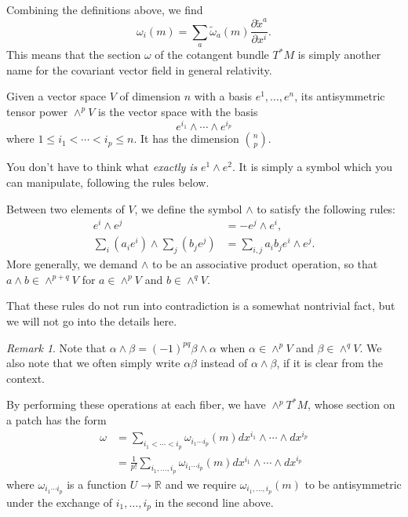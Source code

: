 \documentclass[12pt]{article}
\numberwithin{equation}{section}
\theoremstyle{remark}
\newtheorem{remark}[definition]{Remark}
\def\bR{\mathbb{R}}
\begin{document}
Combining the definitions above, we find \begin{equation}
\omega_i(m)=\sum_a \tilde\omega_a(m) \frac{\partial \tilde x^a}{\partial x^i}.
\end{equation}
This means that the section $\omega$ of the cotangent bundle $T^*M$ is simply another name for the covariant vector field in general relativity.

\begin{definition}
  Given a vector space $V$ of dimension $n$ with a basis $e^1,\ldots,e^n$, 
  its antisymmetric tensor power $\wedge^p V$ is the vector space with the basis \begin{equation}
    e^{i_1}\wedge \cdots \wedge e^{i_p}
  \end{equation} where $1\le i_1<\cdots<i_p\le n$.
  It has the dimension $\binom{n}{p}$.
\end{definition}

You don't have to think what \emph{exactly is} $e^1\wedge e^2$.
It is simply a symbol which you can manipulate, following the rules below.
\begin{definition}
Between two elements of $V$,
we define the symbol $\wedge$ to satisfy the following rules:
\begin{align}
  e^i\wedge e^j &= - e^j\wedge e^i,\\
  \sum_i (a_i e^i) \wedge \sum_j (b_j e^j) &= \sum_{i,j} a_i b_j e^i\wedge e^j.
\end{align}
More generally, we demand $\wedge$ to be an associative product operation,
so that $a\wedge b\in \wedge^{p+q} V$ for $a\in \wedge^p V$ and $b\in \wedge^q V$.
\end{definition}
That these rules do not run into contradiction is a somewhat nontrivial fact,
but we will not go into the details here.
\begin{remark}
  Note that $\alpha\wedge \beta=(-1)^{pq}\beta\wedge \alpha$ when  $\alpha\in \wedge^p V$ and $\beta\in \wedge^q V$.
We also note that we often simply write $\alpha\beta$ instead of $\alpha\wedge \beta$, if it is clear from the context.  
\end{remark}


By performing these operations at each fiber, we have $\wedge^p T^*M$,
whose section on a patch has the form \begin{align}
  \omega   &=
  \sum_{i_1<\cdots<i_p} \omega_{i_1\cdots i_p}(m) dx^{i_1}\wedge \cdots \wedge dx^{i_p} \\
  &= 
  \frac{1}{p!} \sum_{i_1,\ldots,i_p} \omega_{i_1\cdots i_p}(m) dx^{i_1}\wedge \cdots \wedge dx^{i_p} 
\end{align}
where $\omega_{i_1\cdots i_p}$ is a function $U\to \bR$ 
and we require
$\omega_{i_1,\ldots,i_p}(m)$ to be antisymmetric under the exchange of $i_1,\ldots,i_p$
in the second line above.
\end{document}
